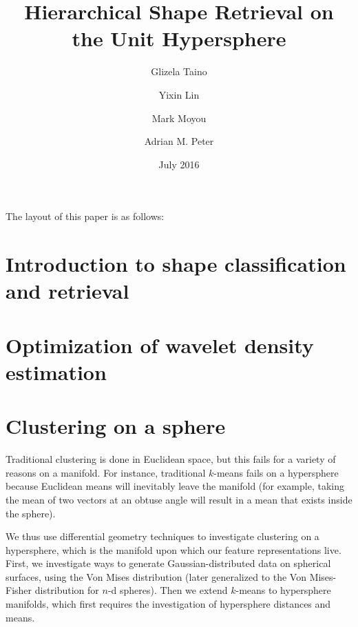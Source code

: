 \documentclass{article}
\begin{document}
\date{July 2016}

\title{Hierarchical Shape Retrieval on the Unit Hypersphere}
\author{Glizela Taino}
\author{Yixin Lin}

\author{Mark Moyou}
\author{Adrian M. Peter}
\setcounter{Maxaffil}{0}
\renewcommand\Affilfont{\small}
\maketitle



The layout of this paper is as follows:

\part{Introduction to shape classification and retrieval}
  
  
  
  

\part{Optimization of wavelet density estimation}
  

\part{Clustering on a sphere}

  Traditional clustering is done in Euclidean space, but this fails for a variety of reasons on a manifold. For instance, traditional $k$-means fails on a hypersphere because Euclidean means will inevitably leave the manifold (for example, taking the mean of two vectors at an obtuse angle will result in a mean that exists inside the sphere).

  We thus use differential geometry techniques to investigate clustering on a hypersphere, which is the manifold upon which our feature representations live. First, we investigate ways to generate Gaussian-distributed data on spherical surfaces, using the Von Mises distribution (later generalized to the Von Mises-Fisher distribution for $n$-d spheres). Then we extend $k$-means to hypersphere manifolds, which first requires the investigation of hypersphere distances and means.
\end{document}
